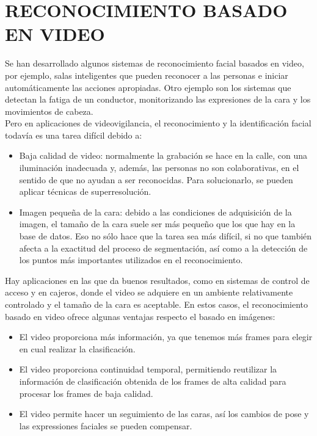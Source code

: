 \documentclass[a4paper,11pt]{article}
\begin{document}
 
 
 

\section{RECONOCIMIENTO BASADO EN VIDEO}
Se han desarrollado algunos sistemas de reconocimiento facial basados en video, por ejemplo, salas inteligentes que pueden reconocer a las personas e iniciar automáticamente las acciones apropiadas. Otro ejemplo son los sistemas que detectan la fatiga de un conductor, monitorizando las expresiones de la cara y los movimientos de cabeza.\\

 Pero en aplicaciones de videovigilancia, el reconocimiento y la identificación facial todavía es una tarea difícil debido a:
 \begin{itemize}
  
  
\item Baja calidad de video: normalmente la grabación se hace en la calle, con una iluminación inadecuada y, además, las personas no son colaborativas, en el sentido de que no ayudan a ser reconocidas. Para solucionarlo, se pueden aplicar técnicas de superresolución.\\

\item   Imagen pequeña de la cara: debido a las condiciones de adquisición de la imagen, el tamaño de la cara suele ser más pequeño que los que hay en la base de datos. Eso no sólo hace que la tarea sea más difícil, si no que también afecta a la exactitud del proceso de segmentación, así como a la detección de los puntos más importantes utilizados en el reconocimiento.\\
\end{itemize}
Hay aplicaciones en las que da buenos resultados, como en sistemas de control de acceso y en cajeros, donde el video se adquiere en un ambiente relativamente controlado y el tamaño de la cara es aceptable. En estos casos, el reconocimiento basado en video ofrece algunas ventajas respecto el basado en imágenes:\\
 \begin{itemize}
\item El video proporciona más información, ya que tenemos más frames para elegir en cual realizar la clasificación.
\item 
El video proporciona continuidad temporal, permitiendo reutilizar la información de clasificación obtenida de los frames de alta calidad para procesar los frames de baja calidad.
\item
El video permite hacer un seguimiento de las caras, así los cambios de pose y las expressiones faciales se pueden compensar.
 
\end{itemize}
\end{document}
